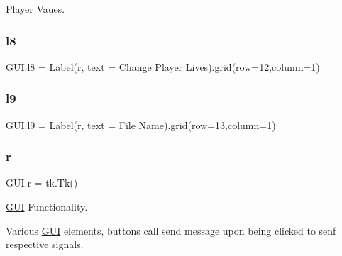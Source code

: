 Player Vaues. 

\mbox{\label{namespace_g_u_i_a66ff0e016573e1293d4bf6cc8e2238bd}} 
\subsubsection{\texorpdfstring{l8}{l8}}
{\footnotesize\ttfamily G\+U\+I.\+l8 = Label(\mbox{\hyperlink{_s_d_l__opengl_8h_a42ce7cdc612e53abee15043f80220d97}{r}}, text = \textquotesingle{}Change Player Lives\textquotesingle{}).grid(\mbox{\hyperlink{_s_d_l__opengl__glext_8h_a90d3e7e4182a9630993f640fa0443b0b}{row}}=12,\mbox{\hyperlink{_s_d_l__opengl__glext_8h_a0027cf4871ca9857e8e241960701189f}{column}}=1)}

\mbox{\label{namespace_g_u_i_a92765160ab69a02bcf2f7aa02a16aaa7}} 
\subsubsection{\texorpdfstring{l9}{l9}}
{\footnotesize\ttfamily G\+U\+I.\+l9 = Label(\mbox{\hyperlink{_s_d_l__opengl_8h_a42ce7cdc612e53abee15043f80220d97}{r}}, text = \textquotesingle{}File \mbox{\hyperlink{_python-ast_8h_a3e9f22c154a65956ebd413d2d8dafc0f}{Name}}\textquotesingle{}).grid(\mbox{\hyperlink{_s_d_l__opengl__glext_8h_a90d3e7e4182a9630993f640fa0443b0b}{row}}=13,\mbox{\hyperlink{_s_d_l__opengl__glext_8h_a0027cf4871ca9857e8e241960701189f}{column}}=1)}

\mbox{\label{namespace_g_u_i_a75551f8a671434e8c984ec81add33a23}} 
\subsubsection{\texorpdfstring{r}{r}}
{\footnotesize\ttfamily G\+U\+I.\+r = tk.\+Tk()}



\mbox{\hyperlink{namespace_g_u_i}{G\+UI}} Functionality. 

Various \mbox{\hyperlink{namespace_g_u_i}{G\+UI}} elements, buttons call send message upon being clicked to senf respective signals. \mbox{\label{namespace_g_u_i_a50392865479db3a869a19c926d474f1f}} 
